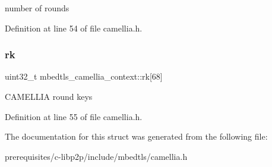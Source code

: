 number of rounds 

Definition at line 54 of file camellia.\+h.

\mbox{\label{structmbedtls__camellia__context_ab5d709c14cdfa36ac163bfd973324f19}} 
\subsubsection{\texorpdfstring{rk}{rk}}
{\footnotesize\ttfamily uint32\+\_\+t mbedtls\+\_\+camellia\+\_\+context\+::rk\mbox{[}68\mbox{]}}

C\+A\+M\+E\+L\+L\+IA round keys 

Definition at line 55 of file camellia.\+h.



The documentation for this struct was generated from the following file\+:\begin{DoxyCompactItemize}
\item 
prerequisites/c-\/libp2p/include/mbedtls/camellia.\+h\end{DoxyCompactItemize}
